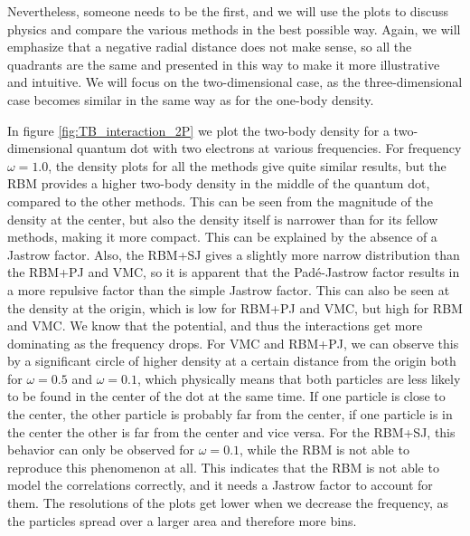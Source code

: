 Nevertheless, someone needs to be the first, and we will use the plots to discuss physics and compare the various methods in the best possible way. Again, we will emphasize that a negative radial distance does not make sense, so all the quadrants are the same and presented in this way to make it more illustrative and intuitive. We will focus on the two-dimensional case, as the three-dimensional case becomes similar in the same way as for the one-body density. 

In figure \eqref{fig:TB_interaction_2P} we plot the two-body density for a two-dimensional quantum dot with two electrons at various frequencies. For frequency $\omega=1.0$, the density plots for all the methods give quite similar results, but the RBM provides a higher two-body density in the middle of the quantum dot, compared to the other methods. This can be seen from the magnitude of the density at the center, but also the density itself is narrower than for its fellow methods, making it more compact. This can be explained by the absence of a Jastrow factor. Also, the RBM+SJ gives a slightly more narrow distribution than the RBM+PJ and VMC, so it is apparent that the Padé-Jastrow factor results in a more repulsive factor than the simple Jastrow factor. This can also be seen at the density at the origin, which is low for RBM+PJ and VMC, but high for RBM and VMC. We know that the potential, and thus the interactions get more dominating as the frequency drops. For VMC and RBM+PJ, we can observe this by a significant circle of higher density at a certain distance from the origin both for $\omega=0.5$ and $\omega=0.1$, which physically means that both particles are less likely to be found in the center of the dot at the same time. If one particle is close to the center, the other particle is probably far from the center, if one particle is in the center the other is far from the center and vice versa. For the RBM+SJ, this behavior can only be observed for $\omega=0.1$, while the RBM is not able to reproduce this phenomenon at all. This indicates that the RBM is not able to model the correlations correctly, and it needs a Jastrow factor to account for them. The resolutions of the plots get lower when we decrease the frequency, as the particles spread over a larger area and therefore more bins.

